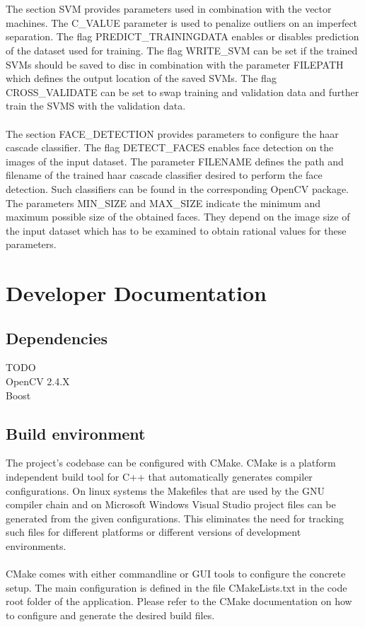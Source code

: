\\
\\
The section SVM provides parameters used in combination with the vector machines. The C\_VALUE parameter is used to penalize outliers on an imperfect separation. The flag PREDICT\_TRAININGDATA enables or disables prediction of the dataset used for training. The flag WRITE\_SVM can be set if the trained SVMs should be saved to disc in combination with the parameter FILEPATH which defines the output location of the saved SVMs. The flag CROSS\_VALIDATE can be set to swap training and validation data and further train the SVMS with the validation data.
\\
\\
The section FACE\_DETECTION provides parameters to configure the haar cascade classifier. The flag DETECT\_FACES enables face detection on the images of the input dataset. The parameter FILENAME defines the path and filename of the trained haar cascade classifier desired to perform the face detection. Such classifiers can be found in the corresponding OpenCV package. The parameters MIN\_SIZE and MAX\_SIZE indicate the minimum and maximum possible size of the obtained faces. They depend on the image size of the input dataset which has to be examined to obtain rational values for these parameters.


\section{Developer Documentation}\label{sec:devdoc}

\subsection{Dependencies}

TODO
\\
OpenCV 2.4.X
\\
Boost

\subsection{Build environment}

The project’s codebase can be configured with CMake. CMake is a platform independent build
tool for C++ that automatically generates compiler configurations. On linux systems the Makefiles that are used by the GNU compiler chain and on Microsoft Windows Visual Studio project files can be generated from the given configurations. This eliminates the need for tracking such files for different platforms or different versions of development environments.
\\
\\
CMake comes with either commandline or GUI tools to configure the concrete setup. The main configuration is defined in the file CMakeLists.txt in the code root folder of the application. Please refer to the CMake documentation on how to configure and generate the desired build files.

